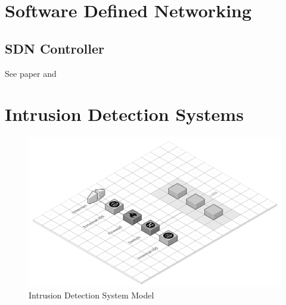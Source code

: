 \lipsum[1-2]


\section{Software Defined Networking}
\label{sec:sdn}

\lipsum[1-3]


\subsection{SDN Controller}
\label{subsec:sdn-controller}

See paper \cite{Zhu2019} and \cite{Bondkovskii2016} \\
\lipsum[1-2]


\section{Intrusion Detection Systems}
\label{sec:intrusion-detection-system}

\lipsum[1-4]

    \begin{figure}[h!]
        \centering
        \includegraphics[scale=0.23]{figures/Intrusion Detection System Model.png}
        \caption{Intrusion Detection System Model}
        \label{fig:IDS-model}
    \end{figure}

